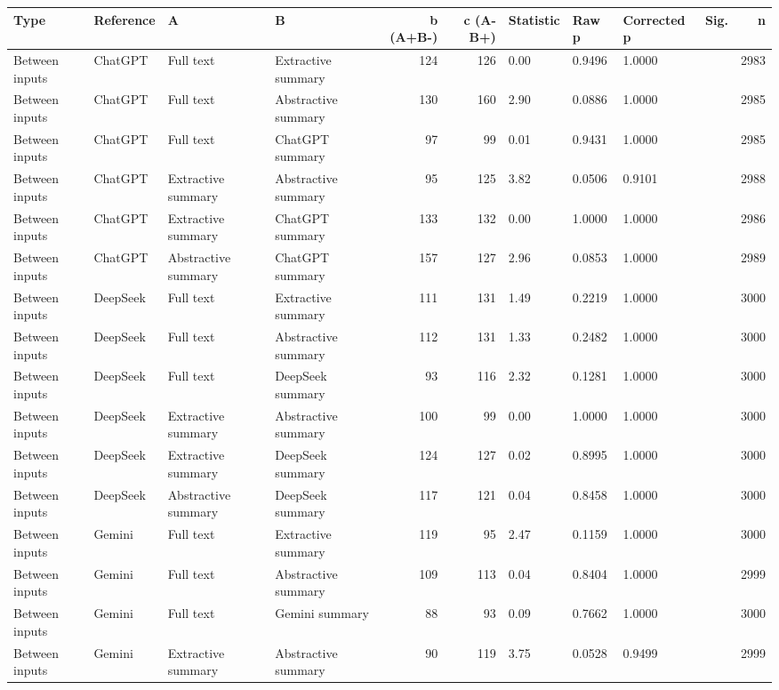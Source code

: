 \begin{tabular}{llllrrllllr}
\toprule
Type & Reference & A & B & b (A+B-) & c (A-B+) & Statistic & Raw p & Corrected p & Sig. & n \\
\midrule
Between inputs & ChatGPT & Full text & Extractive summary & 124 & 126 & 0.00 & 0.9496 & 1.0000 &  & 2983 \\
Between inputs & ChatGPT & Full text & Abstractive summary & 130 & 160 & 2.90 & 0.0886 & 1.0000 &  & 2985 \\
Between inputs & ChatGPT & Full text & ChatGPT summary & 97 & 99 & 0.01 & 0.9431 & 1.0000 &  & 2985 \\
Between inputs & ChatGPT & Extractive summary & Abstractive summary & 95 & 125 & 3.82 & 0.0506 & 0.9101 &  & 2988 \\
Between inputs & ChatGPT & Extractive summary & ChatGPT summary & 133 & 132 & 0.00 & 1.0000 & 1.0000 &  & 2986 \\
Between inputs & ChatGPT & Abstractive summary & ChatGPT summary & 157 & 127 & 2.96 & 0.0853 & 1.0000 &  & 2989 \\
Between inputs & DeepSeek & Full text & Extractive summary & 111 & 131 & 1.49 & 0.2219 & 1.0000 &  & 3000 \\
Between inputs & DeepSeek & Full text & Abstractive summary & 112 & 131 & 1.33 & 0.2482 & 1.0000 &  & 3000 \\
Between inputs & DeepSeek & Full text & DeepSeek summary & 93 & 116 & 2.32 & 0.1281 & 1.0000 &  & 3000 \\
Between inputs & DeepSeek & Extractive summary & Abstractive summary & 100 & 99 & 0.00 & 1.0000 & 1.0000 &  & 3000 \\
Between inputs & DeepSeek & Extractive summary & DeepSeek summary & 124 & 127 & 0.02 & 0.8995 & 1.0000 &  & 3000 \\
Between inputs & DeepSeek & Abstractive summary & DeepSeek summary & 117 & 121 & 0.04 & 0.8458 & 1.0000 &  & 3000 \\
Between inputs & Gemini & Full text & Extractive summary & 119 & 95 & 2.47 & 0.1159 & 1.0000 &  & 3000 \\
Between inputs & Gemini & Full text & Abstractive summary & 109 & 113 & 0.04 & 0.8404 & 1.0000 &  & 2999 \\
Between inputs & Gemini & Full text & Gemini summary & 88 & 93 & 0.09 & 0.7662 & 1.0000 &  & 3000 \\
Between inputs & Gemini & Extractive summary & Abstractive summary & 90 & 119 & 3.75 & 0.0528 & 0.9499 &  & 2999 \\

\end{tabular}
